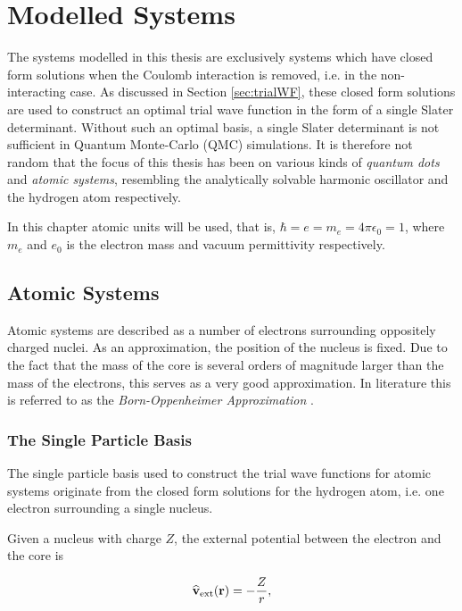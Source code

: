 \chapter{Modelled Systems}
\label{ch:modelledSystems}

The systems modelled in this thesis are exclusively systems which have closed form solutions when the Coulomb interaction is removed, i.e. in the non-interacting case. As discussed in Section \ref{sec:trialWF}, these closed form solutions are used to construct an optimal trial wave function in the form of a single Slater determinant. Without such an optimal basis, a single Slater determinant is not sufficient in Quantum Monte-Carlo (QMC) simulations. It is therefore not random that the focus of this thesis has been on various kinds of \textit{quantum dots} and \textit{atomic systems}, resembling the analytically solvable harmonic oscillator and the hydrogen atom respectively.

In this chapter atomic units will be used, that is, $\hbar=e=m_e=4\pi\epsilon_0 = 1$, where $m_e$ and $e_0$ is the electron mass and vacuum permittivity respectively.

\section{Atomic Systems}
\label{sec:modelAtoms}

Atomic systems are described as a number of electrons surrounding oppositely charged nuclei. As an approximation, the position of the nucleus is fixed. Due to the fact that the mass of the core is several orders of magnitude larger than the mass of the electrons, this serves as a very good approximation. In literature this is referred to as the \textit{Born-Oppenheimer Approximation} \cite{Sakurai:94}.

\subsection{The Single Particle Basis}

The single particle basis used to construct the trial wave functions for atomic systems originate from the closed form solutions for the hydrogen atom, i.e. one electron surrounding a single nucleus.

Given a nucleus with charge $Z$, the external potential between the electron and the core is

\begin{equation}
 {\bf\widehat{v}}_\mathrm{ext}(\mathbf{r}) = -\frac{Z}{r}, \label{eq:v0hydro}
\end{equation}

